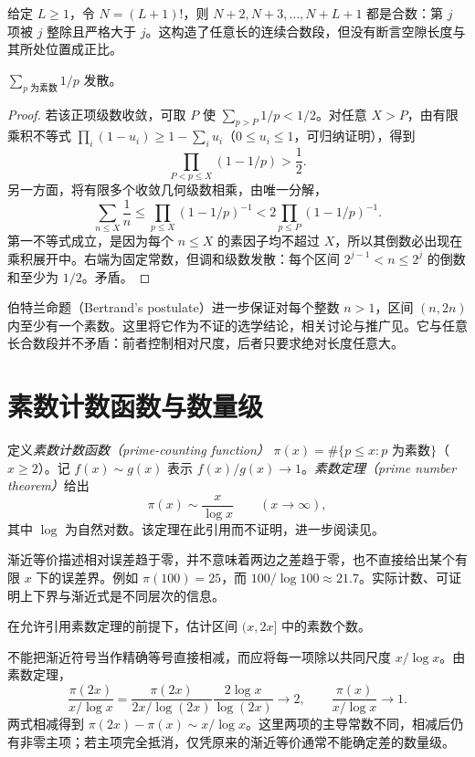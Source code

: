 给定 $L\ge1$，令 $N=(L+1)!$，则 $N+2,N+3,\ldots,N+L+1$ 都是合数：第 $j$ 项被 $j$ 整除且严格大于 $j$。这构造了任意长的连续合数段，但没有断言空隙长度与其所处位置成正比。

\begin{theorem}[素数倒数和发散]
$\sum_{p\text{ 为素数}}1/p$ 发散。
\end{theorem}
\begin{proof}
若该正项级数收敛，可取 $P$ 使 $\sum_{p>P}1/p<1/2$。对任意 $X>P$，由有限乘积不等式 $\prod_i(1-u_i)\ge1-\sum_i u_i$（$0\le u_i\le1$，可归纳证明），得到
\[
 \prod_{P<p\le X}(1-1/p)>\frac12.
\]
另一方面，将有限多个收敛几何级数相乘，由唯一分解，
\[
 \sum_{n\le X}\frac1n
 \le\prod_{p\le X}(1-1/p)^{-1}
 <2\prod_{p\le P}(1-1/p)^{-1}.
\]
第一不等式成立，是因为每个 $n\le X$ 的素因子均不超过 $X$，所以其倒数必出现在乘积展开中。右端为固定常数，但调和级数发散：每个区间 $2^{j-1}<n\le2^j$ 的倒数和至少为 $1/2$。矛盾。
\end{proof}

伯特兰命题（Bertrand's postulate）进一步保证对每个整数 $n>1$，区间 $(n,2n)$ 内至少有一个素数。这里将它作为不证的选学结论，相关讨论与推广见\cite{sondow-bertrand}。它与任意长合数段并不矛盾：前者控制相对尺度，后者只要求绝对长度任意大。

\section{素数计数函数与数量级}

定义\emph{素数计数函数（prime-counting function）} $\pi(x)=\#\{p\le x:p\text{ 为素数}\}$（$x\ge2$）。记 $f(x)\sim g(x)$ 表示 $f(x)/g(x)\to1$。\emph{素数定理（prime number theorem）}给出
\begin{equation}
 \pi(x)\sim\frac{x}{\log x}\qquad(x\to\infty),
 \label{eq:prime-number-theorem}
\end{equation}
其中 $\log$ 为自然对数。该定理在此引用而不证明，进一步阅读见\cite{kedlaya-pnt}。

渐近等价描述相对误差趋于零，并不意味着两边之差趋于零，也不直接给出某个有限 $x$ 下的误差界。例如 $\pi(100)=25$，而 $100/\log100\approx21.7$。实际计数、可证明上下界与渐近式是不同层次的信息。

\begin{example}[如何正确使用渐近等价]
在允许引用素数定理的前提下，估计区间 $(x,2x]$ 中的素数个数。
\end{example}
\begin{solve}
不能把渐近符号当作精确等号直接相减，而应将每一项除以共同尺度 $x/\log x$。由素数定理，
\[
 \frac{\pi(2x)}{x/\log x}
 =\frac{\pi(2x)}{2x/\log(2x)}\frac{2\log x}{\log(2x)}\longrightarrow2,
 \qquad \frac{\pi(x)}{x/\log x}\longrightarrow1.
\]
两式相减得到 $\pi(2x)-\pi(x)\sim x/\log x$。这里两项的主导常数不同，相减后仍有非零主项；若主项完全抵消，仅凭原来的渐近等价通常不能确定差的数量级。
\end{solve}

